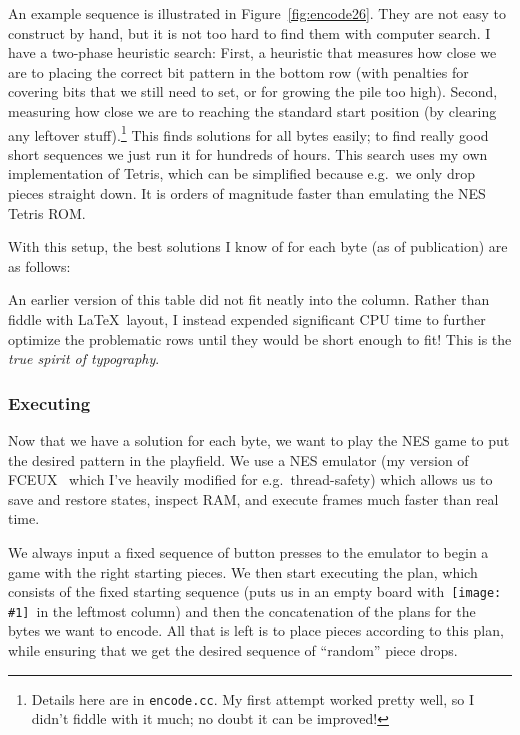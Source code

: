 \documentclass[twocolumn]{article}
\newcommand\tetrispiece[1]{\,\texttt{[image: \#1]}\hspace{0.1em}}
\newcommand\svert{\tetrispiece{s_vert}}
\begin{document}
An example sequence is illustrated in Figure~\ref{fig:encode26}. They
are not easy to construct by hand, but it is not too hard to find them
with computer search. I have a two-phase heuristic search: First,
a heuristic that measures how close we are to placing the correct bit
pattern in the bottom row (with penalties for covering bits that we
still need to set, or for growing the pile too high). Second, measuring
how close we are to reaching the standard start position (by clearing
any leftover stuff).\!\footnote{Details here are in {\tt encode.cc}.
  My first attempt worked pretty well, so I didn't fiddle with it
  much; no doubt it can be improved!} This finds solutions for all
bytes easily; to find really good short sequences we just run it for
hundreds of hours. This search uses my own implementation of Tetris,
which can be simplified because e.g.~we only drop pieces straight down.
It is orders of magnitude faster than emulating the NES Tetris ROM.

With this setup, the best solutions I know of for each byte (as of
publication) are as follows:




An earlier version of this table did not fit neatly into the column.
Rather than fiddle with \LaTeX\ layout, I instead expended significant
CPU time to further optimize the problematic rows until they would
be short enough to fit! This is the {\em true spirit of typography}.

\subsubsection{Executing}

Now that we have a solution for each byte, we want to play the NES
game to put the desired pattern in the playfield. We use a NES
emulator (my version of FCEUX~\cite{fceux} which I've heavily modified
for e.g.~thread-safety) which allows us to save and restore states,
inspect RAM, and execute frames much faster than real time.

We always input a fixed sequence of button presses to the emulator to
begin a game with the right starting pieces. We then start executing
the plan, which consists of the fixed starting sequence (puts us in an
empty board with \svert\ in the leftmost column) and then the
concatenation of the plans for the bytes we want to encode. All that
is left is to place pieces according to this plan, while ensuring that
we get the desired sequence of ``random'' piece drops.
\end{document}
